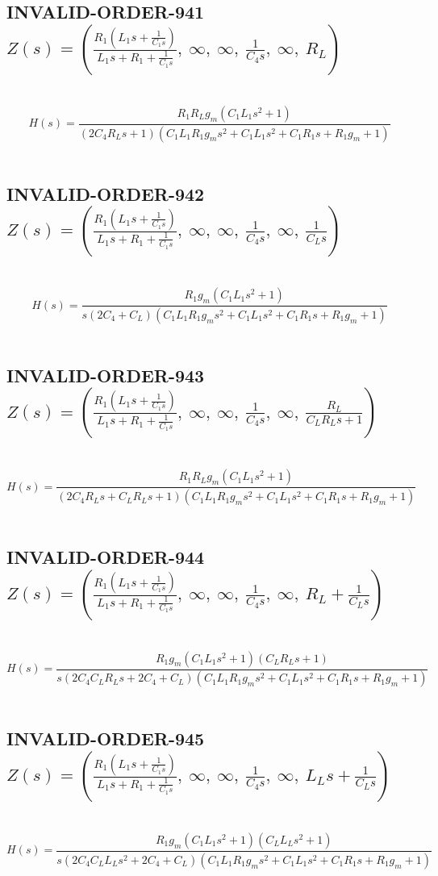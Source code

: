 \documentclass{article}
\begin{document}
\subsection{INVALID-ORDER-941 $Z(s) = \left( \frac{R_{1} \left(L_{1} s + \frac{1}{C_{1} s}\right)}{L_{1} s + R_{1} + \frac{1}{C_{1} s}}, \  \infty, \  \infty, \  \frac{1}{C_{4} s}, \  \infty, \  R_{L}\right)$ } \ 
\textbf{\[H(s) = \frac{R_{1} R_{L} g_{m} \left(C_{1} L_{1} s^{2} + 1\right)}{\left(2 C_{4} R_{L} s + 1\right) \left(C_{1} L_{1} R_{1} g_{m} s^{2} + C_{1} L_{1} s^{2} + C_{1} R_{1} s + R_{1} g_{m} + 1\right)}\] } \ 
\subsection{INVALID-ORDER-942 $Z(s) = \left( \frac{R_{1} \left(L_{1} s + \frac{1}{C_{1} s}\right)}{L_{1} s + R_{1} + \frac{1}{C_{1} s}}, \  \infty, \  \infty, \  \frac{1}{C_{4} s}, \  \infty, \  \frac{1}{C_{L} s}\right)$ } \ 
\textbf{\[H(s) = \frac{R_{1} g_{m} \left(C_{1} L_{1} s^{2} + 1\right)}{s \left(2 C_{4} + C_{L}\right) \left(C_{1} L_{1} R_{1} g_{m} s^{2} + C_{1} L_{1} s^{2} + C_{1} R_{1} s + R_{1} g_{m} + 1\right)}\] } \ 
\subsection{INVALID-ORDER-943 $Z(s) = \left( \frac{R_{1} \left(L_{1} s + \frac{1}{C_{1} s}\right)}{L_{1} s + R_{1} + \frac{1}{C_{1} s}}, \  \infty, \  \infty, \  \frac{1}{C_{4} s}, \  \infty, \  \frac{R_{L}}{C_{L} R_{L} s + 1}\right)$ } \ 
\textbf{\[H(s) = \frac{R_{1} R_{L} g_{m} \left(C_{1} L_{1} s^{2} + 1\right)}{\left(2 C_{4} R_{L} s + C_{L} R_{L} s + 1\right) \left(C_{1} L_{1} R_{1} g_{m} s^{2} + C_{1} L_{1} s^{2} + C_{1} R_{1} s + R_{1} g_{m} + 1\right)}\] } \ 
\subsection{INVALID-ORDER-944 $Z(s) = \left( \frac{R_{1} \left(L_{1} s + \frac{1}{C_{1} s}\right)}{L_{1} s + R_{1} + \frac{1}{C_{1} s}}, \  \infty, \  \infty, \  \frac{1}{C_{4} s}, \  \infty, \  R_{L} + \frac{1}{C_{L} s}\right)$ } \ 
\textbf{\[H(s) = \frac{R_{1} g_{m} \left(C_{1} L_{1} s^{2} + 1\right) \left(C_{L} R_{L} s + 1\right)}{s \left(2 C_{4} C_{L} R_{L} s + 2 C_{4} + C_{L}\right) \left(C_{1} L_{1} R_{1} g_{m} s^{2} + C_{1} L_{1} s^{2} + C_{1} R_{1} s + R_{1} g_{m} + 1\right)}\] } \ 
\subsection{INVALID-ORDER-945 $Z(s) = \left( \frac{R_{1} \left(L_{1} s + \frac{1}{C_{1} s}\right)}{L_{1} s + R_{1} + \frac{1}{C_{1} s}}, \  \infty, \  \infty, \  \frac{1}{C_{4} s}, \  \infty, \  L_{L} s + \frac{1}{C_{L} s}\right)$ } \ 
\textbf{\[H(s) = \frac{R_{1} g_{m} \left(C_{1} L_{1} s^{2} + 1\right) \left(C_{L} L_{L} s^{2} + 1\right)}{s \left(2 C_{4} C_{L} L_{L} s^{2} + 2 C_{4} + C_{L}\right) \left(C_{1} L_{1} R_{1} g_{m} s^{2} + C_{1} L_{1} s^{2} + C_{1} R_{1} s + R_{1} g_{m} + 1\right)}\] } \ 
\end{document}
